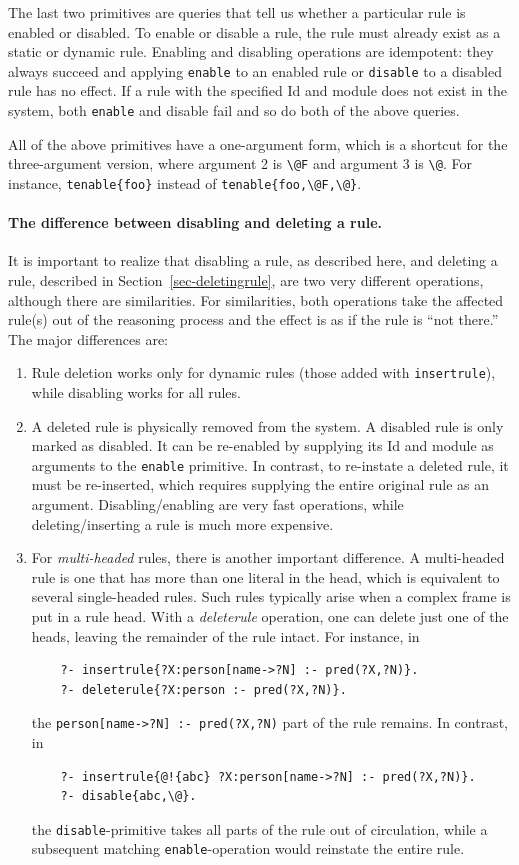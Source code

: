 \documentclass[11pt]{article}
\newcommand{\bs}{\textbackslash}
\begin{document}
The last two primitives are queries that tell us whether a particular rule
is enabled or disabled. To enable or disable a rule, the rule must already
exist as a static or dynamic rule. Enabling  and disabling operations are
idempotent: they always succeed and applying \texttt{enable} to an enabled
rule or \texttt{disable} to a disabled rule has no effect.  
If a rule with the specified Id and module does not exist in the system,
both \texttt{enable} and disable fail and so do both of the above queries.

All of the above primitives have a one-argument form, which is a
shortcut for the three-argument version, where argument 2 is \texttt{\bs{}@F}
and argument 3 is \texttt{\bs{}@}. For instance,
\texttt{tenable\{foo\}} instead of
\texttt{tenable\{foo,\bs{}@F,\bs{}@\}}. 

\paragraph{The difference between disabling and deleting a rule.}
It is important to realize that disabling a rule, as described here,
and deleting a rule, described in Section~\ref{sec-deletingrule}, are
two very different operations, although there are similarities.
For similarities, both operations take the affected rule(s) out of the
reasoning process and the effect is as if the rule is ``not there.''
The major differences are:
\begin{enumerate}
\item  Rule deletion works only for dynamic rules (those added with
  \texttt{insertrule}), while disabling works for all rules.
\item  A deleted rule is physically removed from the system. A disabled
  rule is only marked as disabled. It can be re-enabled by supplying its Id
  and module as arguments to the \texttt{enable} primitive. In contrast,
  to re-instate a deleted rule, it must be re-inserted, which requires supplying
  the entire original rule as an argument. Disabling/enabling are very fast
  operations, while deleting/inserting a rule is much more expensive.
\item For \emph{multi-headed} rules, there is another important difference. 
  A multi-headed rule is one that has more than one literal in the head,
  which is equivalent to several single-headed rules. Such rules
  typically arise when a complex frame is put in a rule head.
   With a \emph{deleterule} operation, one can delete just one of the
   heads, leaving the remainder of the rule intact. For instance, in
\begin{verbatim}
    ?- insertrule{?X:person[name->?N] :- pred(?X,?N)}.
    ?- deleterule{?X:person :- pred(?X,?N)}.
\end{verbatim}
   the \verb|person[name->?N] :- pred(?X,?N)| part of the rule remains. In
   contrast, in
\begin{verbatim}
    ?- insertrule{@!{abc} ?X:person[name->?N] :- pred(?X,?N)}.
    ?- disable{abc,\@}.
\end{verbatim}
   the \texttt{disable}-primitive takes all parts of the rule out of
   circulation, while a subsequent matching
   \texttt{enable}-operation would reinstate the
   entire rule. 
\end{enumerate}
\end{document}
